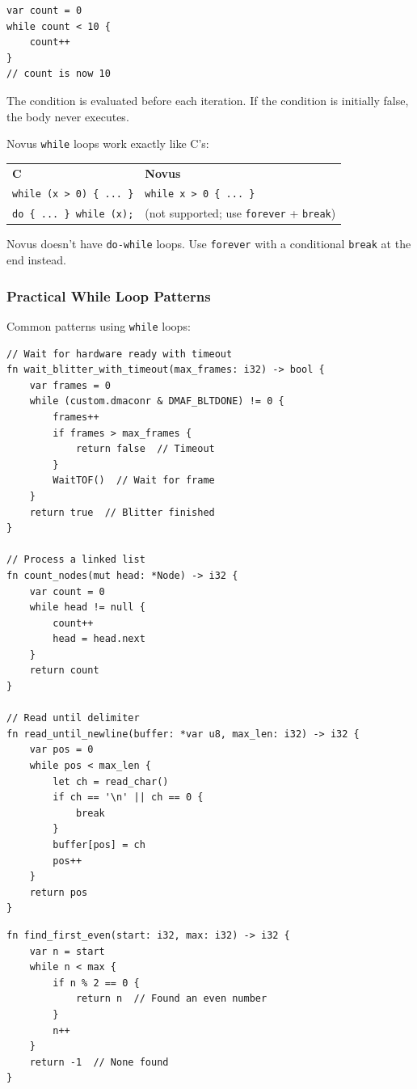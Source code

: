 \begin{lstlisting}
var count = 0
while count < 10 {
    count++
}
// count is now 10
\end{lstlisting}

The condition is evaluated before each iteration. If the condition is initially false, the body never executes.

\begin{comingfromc}
Novus \texttt{while} loops work exactly like C's:

\begin{tabular}{ll}
\textbf{C} & \textbf{Novus} \\
\texttt{while (x > 0) \{ ... \}} & \texttt{while x > 0 \{ ... \}} \\
\texttt{do \{ ... \} while (x);} & (not supported; use \texttt{forever} + \texttt{break}) \\
\end{tabular}

Novus doesn't have \texttt{do-while} loops. Use \texttt{forever} with a conditional \texttt{break} at the end instead.
\end{comingfromc}

\subsubsection{Practical While Loop Patterns}

Common patterns using \texttt{while} loops:

\begin{lstlisting}
// Wait for hardware ready with timeout
fn wait_blitter_with_timeout(max_frames: i32) -> bool {
    var frames = 0
    while (custom.dmaconr & DMAF_BLTDONE) != 0 {
        frames++
        if frames > max_frames {
            return false  // Timeout
        }
        WaitTOF()  // Wait for frame
    }
    return true  // Blitter finished
}

// Process a linked list
fn count_nodes(mut head: *Node) -> i32 {
    var count = 0
    while head != null {
        count++
        head = head.next
    }
    return count
}

// Read until delimiter
fn read_until_newline(buffer: *var u8, max_len: i32) -> i32 {
    var pos = 0
    while pos < max_len {
        let ch = read_char()
        if ch == '\n' || ch == 0 {
            break
        }
        buffer[pos] = ch
        pos++
    }
    return pos
}
\end{lstlisting}

\begin{lstlisting}
fn find_first_even(start: i32, max: i32) -> i32 {
    var n = start
    while n < max {
        if n % 2 == 0 {
            return n  // Found an even number
        }
        n++
    }
    return -1  // None found
}
\end{lstlisting}

